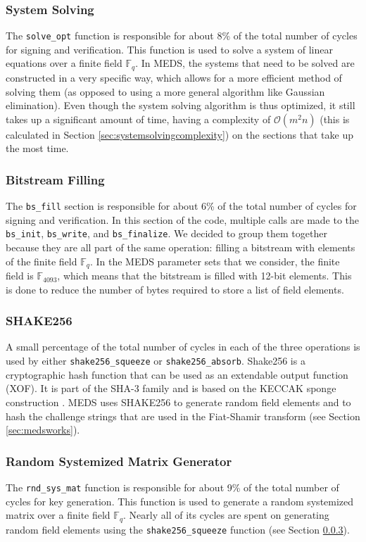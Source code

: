 \documentclass[11pt,a4paper]{report}
\theoremstyle{definition}
\begin{document}
\subsubsection{System Solving}
The \texttt{solve\_opt} function is responsible for about 8\% of the total number of cycles for signing and verification. This function is used to solve a system of linear equations over a finite field $\mathbb{F}_q$. In MEDS, the systems that need to be solved are constructed in a very specific way, which allows for a more efficient method of solving them (as opposed to using a more general algorithm like Gaussian elimination). Even though the system solving algorithm is thus optimized, it still takes up a significant amount of time, having a complexity of $\mathcal{O}(m^2n)$ (this is calculated in Section \ref{sec:systemsolvingcomplexity}) on the sections that take up the most time.

\subsubsection{Bitstream Filling}
The \texttt{bs\_fill} section is responsible for about 6\% of the total number of cycles for signing and verification. In this section of the code, multiple calls are made to the \texttt{bs\_init}, \texttt{bs\_write}, and \texttt{bs\_finalize}. We decided to group them together because they are all part of the same operation: filling a bitstream with elements of the finite field $\mathbb{F}_q$. In the MEDS parameter sets that we consider, the finite field is $\mathbb{F}_{4093}$, which means that the bitstream is filled with 12-bit elements. This is done to reduce the number of bytes required to store a list of field elements.

\subsubsection{SHAKE256}
\label{sec:shake256}
A small percentage of the total number of cycles in each of the three operations is used by either \texttt{shake256\_squeeze} or \texttt{shake256\_absorb}. Shake256 is a cryptographic hash function that can be used as an extendable output function (XOF). It is part of the SHA-3 family \cite{dworkin2015sha} and is based on the KECCAK sponge construction \cite{bertoni2013keccak}. MEDS uses SHAKE256 to generate random field elements and to hash the challenge strings that are used in the Fiat-Shamir transform (see Section \ref{sec:medsworks}).

\subsubsection{Random Systemized Matrix Generator}
The \texttt{rnd\_sys\_mat} function is responsible for about 9\% of the total number of cycles for key generation. This function is used to generate a random systemized matrix over a finite field $\mathbb{F}_q$. Nearly all of its cycles are spent on generating random field elements using the \texttt{shake256\_squeeze} function (see Section \ref{sec:shake256}).
\end{document}
